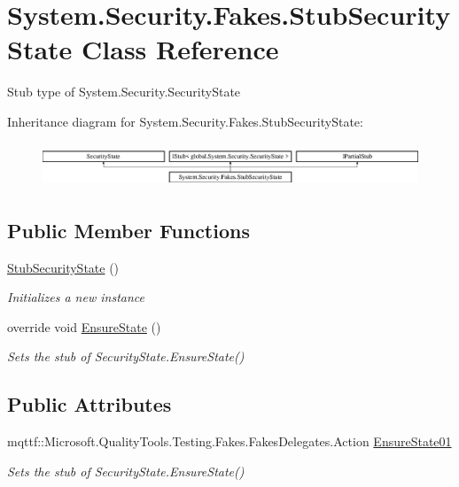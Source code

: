 \hypertarget{class_system_1_1_security_1_1_fakes_1_1_stub_security_state}{\section{System.\-Security.\-Fakes.\-Stub\-Security\-State Class Reference}
\label{class_system_1_1_security_1_1_fakes_1_1_stub_security_state}
}


Stub type of System.\-Security.\-Security\-State 


Inheritance diagram for System.\-Security.\-Fakes.\-Stub\-Security\-State\-:\begin{figure}[H]
\begin{center}
\leavevmode
\includegraphics[height=1.333333cm]{class_system_1_1_security_1_1_fakes_1_1_stub_security_state}
\end{center}
\end{figure}
\subsection*{Public Member Functions}
\begin{DoxyCompactItemize}
\item 
\hyperlink{class_system_1_1_security_1_1_fakes_1_1_stub_security_state_a28f0d7f40d04e9c587a9a5ceb1044bd2}{Stub\-Security\-State} ()
\begin{DoxyCompactList}\small\item\em Initializes a new instance\end{DoxyCompactList}\item 
override void \hyperlink{class_system_1_1_security_1_1_fakes_1_1_stub_security_state_a263f4be898eb5aeeec5f0fa8255dd52a}{Ensure\-State} ()
\begin{DoxyCompactList}\small\item\em Sets the stub of Security\-State.\-Ensure\-State()\end{DoxyCompactList}\end{DoxyCompactItemize}
\subsection*{Public Attributes}
\begin{DoxyCompactItemize}
\item 
mqttf\-::\-Microsoft.\-Quality\-Tools.\-Testing.\-Fakes.\-Fakes\-Delegates.\-Action \hyperlink{class_system_1_1_security_1_1_fakes_1_1_stub_security_state_ae9790ee12847a6ebfb3be26b18bd5af9}{Ensure\-State01}
\begin{DoxyCompactList}\small\item\em Sets the stub of Security\-State.\-Ensure\-State()\end{DoxyCompactList}\end{DoxyCompactItemize}
